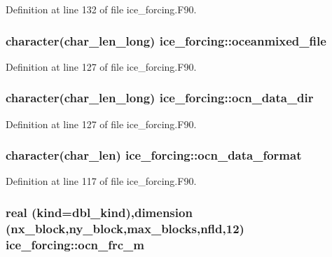 Definition at line 132 of file ice\_\-forcing.F90.\hypertarget{namespaceice__forcing_aec28b3a9dba2ddef0ac023a96fc361bc}{
\subsubsection[{oceanmixed\_\-file}]{\setlength{\rightskip}{0pt plus 5cm}character(char\_\-len\_\-long) {\bf ice\_\-forcing::oceanmixed\_\-file}}}
\label{namespaceice__forcing_aec28b3a9dba2ddef0ac023a96fc361bc}


Definition at line 127 of file ice\_\-forcing.F90.\hypertarget{namespaceice__forcing_a654560673c82ff131fd490ed0e7f36ff}{
\subsubsection[{ocn\_\-data\_\-dir}]{\setlength{\rightskip}{0pt plus 5cm}character(char\_\-len\_\-long) {\bf ice\_\-forcing::ocn\_\-data\_\-dir}}}
\label{namespaceice__forcing_a654560673c82ff131fd490ed0e7f36ff}


Definition at line 127 of file ice\_\-forcing.F90.\hypertarget{namespaceice__forcing_a9d9be81629d968253c14a8c0a5984bda}{
\subsubsection[{ocn\_\-data\_\-format}]{\setlength{\rightskip}{0pt plus 5cm}character(char\_\-len) {\bf ice\_\-forcing::ocn\_\-data\_\-format}}}
\label{namespaceice__forcing_a9d9be81629d968253c14a8c0a5984bda}


Definition at line 117 of file ice\_\-forcing.F90.\hypertarget{namespaceice__forcing_a726eacdcd2c76eb6ed122e4b1543d02d}{
\subsubsection[{ocn\_\-frc\_\-m}]{\setlength{\rightskip}{0pt plus 5cm}real (kind=dbl\_\-kind),dimension (nx\_\-block,ny\_\-block,max\_\-blocks,{\bf nfld},12) {\bf ice\_\-forcing::ocn\_\-frc\_\-m}}}
\label{namespaceice__forcing_a726eacdcd2c76eb6ed122e4b1543d02d}


